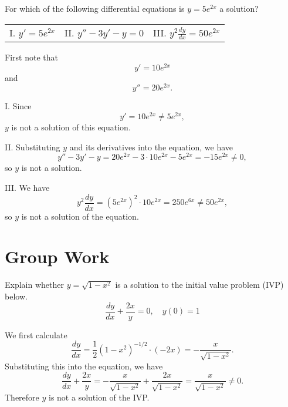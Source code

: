 \documentclass[]{ximera}
\begin{document}
\begin{problem} 
For which of the following differential equations is $y=5e^{2x}$ a solution?

\begin{tabular}{lll}
I. $y'=5e^{2x}$ \qquad \qquad \qquad & II. $y''-3y'-y =0$ \qquad \qquad \qquad & III. $y^2\frac{dy}{dx}=50e^{2x}$
\end{tabular}

\begin{solution}
First note that 
$$
y' = 10 e^{2x}
$$
and
$$
y'' = 20 e^{2x}.
$$

I. Since 
$$
y' = 10 e^{2x} \neq 5 e^{2x},
$$
$y$ is not a solution of this equation.

II. Substituting $y$ and its derivatives into the equation, we have
$$
y''-3y'-y = 20e^{2x}-3 \cdot 10e^{2x} - 5e^{2x} = -15 e^{2x} \neq 0,
$$
so $y$ is not a solution.

III. We have 
$$
y^2 \frac{dy}{dx} = \left(5e^{2x}\right)^2 \cdot 10e^{2x} = 250 e^{6x} \neq 50 e^{2x},
$$
so $y$ is not a solution of the equation.
\end{solution}
\end{problem}

\section{Group Work}
\begin{problem}
Explain whether $y= \sqrt{1-x^2}$ is a solution to the initial value problem (IVP)  below. $$\frac{dy}{dx} +\frac{2x}{y} =0, \quad y(0)=1$$

\begin{solution}
We first calculate
$$
\frac{dy}{dx} = \frac{1}{2} (1-x^2)^{-1/2} \cdot (-2x) = -\frac{x}{\sqrt{1-x^2}}.
$$
Substituting this into the equation, we have
$$
\frac{dy}{dx} +\frac{2x}{y} = -\frac{x}{\sqrt{1-x^2}} + \frac{2x}{\sqrt{1-x^2}} = \frac{x}{\sqrt{1-x^2}} \neq 0.
$$
Therefore $y$ is not a solution of the IVP.
\end{solution}
\end{problem}
\end{document}
